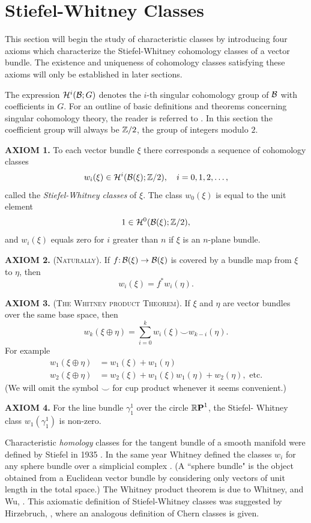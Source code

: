\chapter{Stiefel-Whitney Classes}\label{ch-4}

This section will begin the study of characteristic classes by 
introducing four axioms which characterize the Stiefel-Whitney cohomology
classes of a vector bundle. The existence and uniqueness of cohomology
classes satisfying these axioms will only be established in later sections.

The expression $\mathcal{H}^i(\mathcal{B} ; G)$ denotes the $i$-th singular cohomology group
of $\mathcal{B} $ with coefficients in $G$. For an outline of basic definitions and
theorems concerning singular cohomology theory, the reader is referred to
. In this section the coefficient group will always be $\mathbb{Z}/2$,
the group of integers modulo $2$.

\noindent\textbf{\textsf{AXIOM 1.}} To each vector bundle $\xi$ there corresponds a sequence of
cohomology classes
\[w_i(\xi)\in\mathcal{H}^i(\mathcal{B} (\xi); \mathbb{Z}/2),\quad i=0,1,2,\dots, \]
called the \textit{Stiefel-Whitney classes} of $\xi$. The class $w_0(\xi)$ is equal to
the unit element
\[1\in\mathcal{H}^0(\mathcal{B} (\xi); \mathbb{Z}/2),\]
and $w_i(\xi)$ equals zero for $i$ greater than $n$ if $\xi$ is an $n$-plane bundle.
\vspace{.25cm}

\noindent\textsf{\textbf{AXIOM 2.}} \textsc{(Naturally)}. If $\map{f}{\B (\xi)}{\B (\xi)}$  is covered by a bundle
map from $\xi$ to $\eta$, then
\[w_i(\xi)=f^*w_i(\eta).\]
\vspace{.25cm}

\noindent\textsf{\textbf{AXIOM 3.}} \textsc{(The Whitney product Theorem).} If $\xi$  and  $\eta$ are
vector bundles over the same base space, then
\[w_k(\xi\oplus\eta)=\sum_{i=0}^kw_i(\xi)\smile w_{k-i}(\eta). \]
For example
\begin{align*}
		w_{1}(\xi \oplus \eta)&=w_{1}(\xi)+w_{1}(\eta) \\
		w_{2}(\xi \oplus \eta)&=w_{2}(\xi)+w_{1}(\xi) w_{1}(\eta)+w_{2}(\eta), \text { etc.}
\end{align*}
(We will omit the symbol $\smile$ for cup product whenever it seems convenient.)
\vspace{.25cm}

\noindent\textsf{\textbf{AXIOM 4.}} For the line bundle $\gamma^1_1$ over the circle $\boldsymbol{\mathbb{R}}\boldsymbol{\mathrm{P}}^{1}$, the Stiefel-
Whitney class $w_1(\gamma^1_1)$ is non-zero.
\begin{remark*}
	Characteristic \textit{homology} classes for the tangent bundle of
	a smooth manifold were defined by Stiefel in 1935 \cite{53}. In the same year
	Whitney defined the classes $w_i$ for any sphere bundle over a simplicial
	complex \cite{48}. (A ``sphere bundle" is the object obtained from a Euclidean
	vector bundle by considering only vectors of unit length in the total space.)
	The Whitney product theorem is due to Whitney, \cite{49,50} and Wu, \cite{55}. This axiomatic definition of Stiefel-Whitney classes was suggested
	by Hirzebruch, \cite[p.~58]{54}, where an analogous definition of Chern
	classes is given.
\end{remark*}

